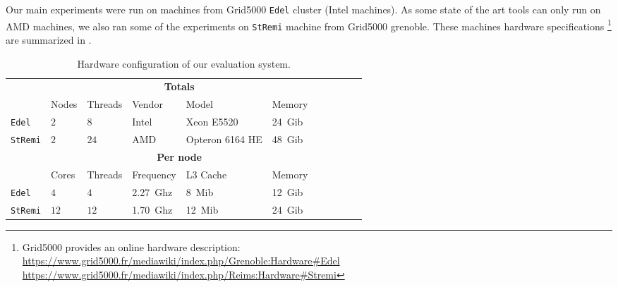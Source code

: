 
Our main experiments were run on  machines from Grid5000 \texttt{Edel}
cluster (Intel machines).
    As some state of the art tools can only run on AMD machines, we also ran
    some of the experiments on
    \texttt{StRemi} machine from Grid5000 grenoble.
    These machines hardware specifications%
   \footnote{Grid5000 provides an online hardware description:\\
       \url{https://www.grid5000.fr/mediawiki/index.php/Grenoble:Hardware\#Edel}
       \\\url{https://www.grid5000.fr/mediawiki/index.php/Reims:Hardware\#Stremi}}
    are summarized in .

\begin{table}[htb]
    \centering
    \begin{tabular}{lllllllllll}
        \toprule
        & \multicolumn{5}{c}{\textbf{Totals}}\\
        & Nodes & Threads & Vendor & Model & Memory \\
        \cmidrule(lr){2-6}
        \texttt{Edel}    & $2$ & $8$  & Intel & Xeon E5520      & \SI{24}{Gib} \\
        \texttt{StRemi} & $2$ & $24$ & AMD   & Opteron 6164 HE & \SI{48}{Gib} \\
        \midrule
        & \multicolumn{5}{c}{\textbf{Per node}}\\
        & Cores & Threads & Frequency & L3 Cache & Memory \\
        \cmidrule(lr){2-6}
        \texttt{Edel}   & $4$  & $4$   & \SI{2.27}{Ghz}& \SI{8}{Mib}  & \SI{12}{Gib} \\
        \texttt{StRemi} & $12$ & $12$  & \SI{1.70}{Ghz}& \SI{12}{Mib} & \SI{24}{Gib}\\
        \bottomrule
    \end{tabular}
    \caption{Hardware configuration of our evaluation system.}
    \label{tab:hw-moca}
\end{table}

